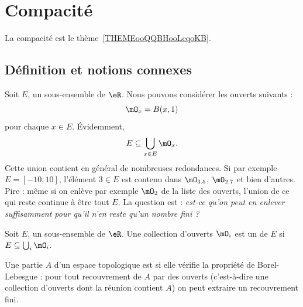 \section{Compacité}

La compacité est le thème~\ref{THEMEooQQBHooLcqoKB}.

\subsection{Définition et notions connexes}

Soit \( E\), un sous-ensemble de \( \eR\). Nous pouvons considérer les ouverts suivants :
\begin{equation}
	\mO_x=B(x,1)
\end{equation}
pour chaque \( x\in E\). Évidemment,
\begin{equation}
	E\subseteq \bigcup_{x\in E}\mO_x.
\end{equation}
Cette union contient en général de nombreuses redondances. Si par exemple \( E=[-10,10]\), l'élément \( 3\in E\) est contenu dans \( \mO_{3.5}\), \( \mO_{2.7}\) et bien d'autres. Pire : même si on enlève par exemple \( \mO_2\) de la liste des ouverts, l'union de ce qui reste continue à être tout \( E\). La question est : \emph{est-ce qu'on peut en enlever suffisamment pour qu'il n'en reste qu'un nombre fini ?}

\begin{definition}
	Soit \( E\), un sous-ensemble de \( \eR\). Une collection d'ouverts \( \mO_i\) est un  de \( E\) si \( E\subseteq \bigcup_{i}\mO_i\).
\end{definition}

\begin{definition} \label{DefJJVsEqs}
	Une partie \( A\) d'un espace topologique est  si elle vérifie la propriété de Borel-Lebesgue : pour tout recouvrement de \( A\) par des ouverts (c'est-à-dire une collection d'ouverts dont la réunion contient \( A\)) on peut extraire un recouvrement fini.
\end{definition}


